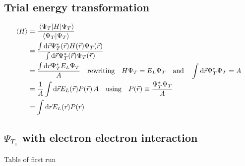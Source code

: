 \documentclass[10pt]{revtex4-1}
\begin{document}
\subsection{Trial energy transformation\label{App:trialEnergy}}
\begin{align}
    \ev{H} &= \frac{ \ev{H}{\Psi_T} }{ \braket{\Psi_T} } \nonumber \\
        &= \frac{
        \int \dd\vec{r} \Psi_T^* ( \vec{r} ) H ( \vec{r} ) \Psi_{T} ( \vec{r} )
        }{
            \int \dd\vec{r} \Psi_T^* ( \vec{r} ) \Psi_{T} ( \vec{r} ) } \\
        &= \frac{ \int \dd\vec{r} \Psi_T^* E_L \Psi_T }{ A }
        \qq{rewriting} H\Psi_T = E_L\Psi_T
        \qq{and} \int\dd\vec{r} \Psi_T^* \Psi_T = A \nonumber \\
        &= \frac{1}{A} \int\dd\vec{r} E_L(\vec{r}) P\qty(\vec{r})\, A \qq{using} P\qty(\vec{r})\equiv \frac{\Psi_T^*\Psi_T}{A} \nonumber\\
        &= \int\dd\vec{r} E_L\qty(\vec{r}) P\qty(\vec{r})
\end{align}

\subsection{ $\Psi_{T_1}$ with electron electron interaction }


\begin{table}[h!tb]
    \centering
    \caption{Table of first run}
\end{table}



\end{document}
